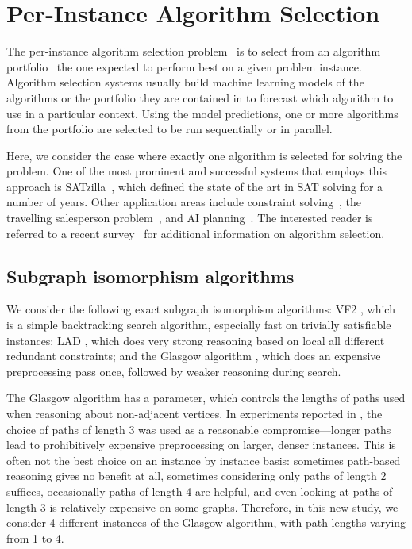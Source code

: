 \documentclass{llncs}
\begin{document}
\section{Per-Instance Algorithm Selection}

The per-instance algorithm selection problem~\cite{rice_algorithm_1976} is to select from an
algorithm portfolio~\cite{huberman_economics_1997,gomes_algorithm_2001} the one expected to perform
best on a given problem instance. Algorithm selection systems usually build machine learning models
of the algorithms or the portfolio they are contained in to forecast which algorithm to use in a
particular context. Using the model predictions, one or more algorithms from the portfolio are
selected to be run sequentially or in parallel.

Here, we consider the case where exactly one algorithm is selected for solving the problem. One of
the most prominent and successful systems that employs this approach is
SATzilla~\cite{xu_satzilla_2008}, which defined the state of the art in SAT solving for a number of
years. Other application areas include constraint solving~\cite{omahony_using_2008}, the travelling
salesperson problem~\cite{kotthoff_improving_2015}, and AI planning~\cite{seipp_learning_2012}.
The interested reader is referred to a recent survey~\cite{kotthoff_algorithm_2014} for additional
information on algorithm selection.

\subsection{Subgraph isomorphism algorithms}

We consider the following exact subgraph isomorphism
algorithms: VF2 \cite{Cordella:2004}, which is a simple backtracking search algorithm, especially
fast on trivially satisfiable instances; LAD \cite{Solnon:2010}, which does very strong reasoning
based on local all different redundant constraints; and the Glasgow algorithm \cite{McCreesh:2015},
which does an expensive preprocessing pass once, followed by weaker reasoning during search.

The Glasgow algorithm has a parameter, which controls the lengths of paths used when reasoning about
non-adjacent vertices.  In experiments reported in \cite{McCreesh:2015}, the choice of paths of
length 3 was used as a reasonable compromise---longer paths lead to prohibitively expensive
preprocessing on larger, denser instances. This is often not the best choice on an instance by
instance basis: sometimes path-based reasoning gives no benefit at all, sometimes considering only
paths of length 2 suffices, occasionally paths of length 4 are helpful, and even looking at paths of
length 3 is relatively expensive on some graphs. Therefore, in this new study, we consider 4
different instances of the Glasgow algorithm, with path lengths varying from 1 to 4.
\end{document}
